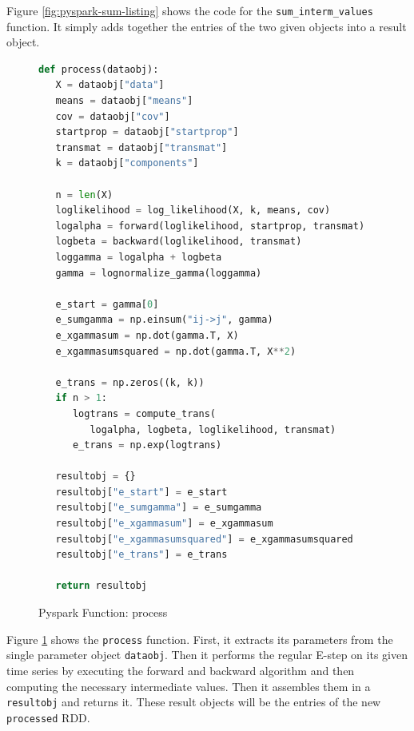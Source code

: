 Figure \ref{fig:pyspark-sum-listing} shows the code for the \texttt{sum\_interm\_values} function. It simply adds together the entries of the two given objects into a result object. 

\begin{figure}
\begin{singlespace}
\begin{lstlisting}[language=Python]
def process(dataobj):
   X = dataobj["data"]
   means = dataobj["means"]
   cov = dataobj["cov"]
   startprop = dataobj["startprop"]
   transmat = dataobj["transmat"]
   k = dataobj["components"]

   n = len(X)
   loglikelihood = log_likelihood(X, k, means, cov)
   logalpha = forward(loglikelihood, startprop, transmat)
   logbeta = backward(loglikelihood, transmat)
   loggamma = logalpha + logbeta
   gamma = lognormalize_gamma(loggamma)

   e_start = gamma[0]
   e_sumgamma = np.einsum("ij->j", gamma)
   e_xgammasum = np.dot(gamma.T, X)
   e_xgammasumsquared = np.dot(gamma.T, X**2)

   e_trans = np.zeros((k, k))
   if n > 1:
      logtrans = compute_trans(
         logalpha, logbeta, loglikelihood, transmat)
      e_trans = np.exp(logtrans)

   resultobj = {}
   resultobj["e_start"] = e_start
   resultobj["e_sumgamma"] = e_sumgamma
   resultobj["e_xgammasum"] = e_xgammasum
   resultobj["e_xgammasumsquared"] = e_xgammasumsquared
   resultobj["e_trans"] = e_trans

   return resultobj
\end{lstlisting}
\end{singlespace}
\caption{Pyspark Function: process}    
\label{fig:pyspark-process-listing}
\end{figure}

Figure \ref{fig:pyspark-process-listing} shows the \texttt{process} function. First, it extracts its parameters from the single parameter object \texttt{dataobj}. Then it performs the regular E-step on its given time series by executing the forward and backward algorithm and then computing the necessary intermediate values. Then it assembles them in a \texttt{resultobj} and returns it. These result objects will be the entries of the new \texttt{processed} RDD.